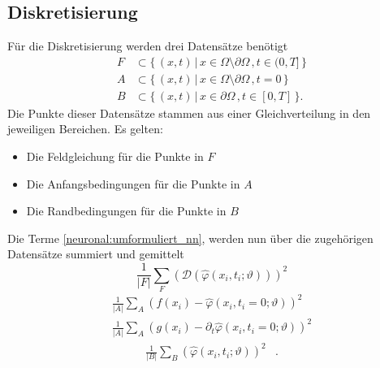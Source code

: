 \subsection{Diskretisierung}\label{neuronal:subsection:diskretierung}
Für die Diskretisierung werden drei Datensätze benötigt
\begin{equation}
    \begin{aligned}
        F &\subset \{\, (x, t) \,|\, x \in \Omega \setminus \partial \Omega\,, t \in (0,T] \,\}\\
        A &\subset \{\, (x, t) \,|\, x \in \Omega \setminus \partial \Omega\,, t = 0 \,\}\\
        B &\subset \{\, (x, t) \,|\, x \in \partial \Omega\,, t \in [0, T] \,\}.
    \end{aligned}
\end{equation}
Die Punkte dieser Datensätze stammen aus einer Gleichverteilung in den jeweiligen Bereichen.
Es gelten:
\begin{itemize}
    \item Die Feldgleichung für die Punkte in $F$
    \item Die Anfangsbedingungen für die Punkte in $A$
    \item Die Randbedingungen für die Punkte in $B$
\end{itemize}
Die Terme \eqref{neuronal:umformuliert_nn}, werden nun über die zugehörigen Datensätze summiert und gemittelt
\begin{equation}
  \frac{1}{\lvert F \rvert} \sum_{F}^{} \left(\mathcal{D}(\hat{\varphi}(x_i, t_i; \vartheta))\right)^2
    \label{neuronal:feldgleichung_umformuliert_netz_disk}
\end{equation}
\begin{equation}
    \begin{aligned}
        \frac{1}{\lvert A \rvert} \sum_{A}^{} \left(f(x_i) - \hat{\varphi}(x_i, t_i = 0; \vartheta)\right)^2\\
        \frac{1}{\lvert A \rvert} \sum_{A}^{} \left(g(x_i) - \partial_t \hat{\varphi}(x_i, t_i = 0; \vartheta)\right)^2
    \end{aligned}
    \label{neuronal:anfangsbedingung_umformuliert_netz_disk}
\end{equation}
\begin{equation}
    \begin{aligned}
        \frac{1}{\lvert B \rvert} \sum_{B}^{} \left(\hat{\varphi}(x_i, t_i; \vartheta)\right)^2 &.
    \end{aligned}
    \label{neuronal:randbedingung_umformuliert_netz_disk}
\end{equation}
